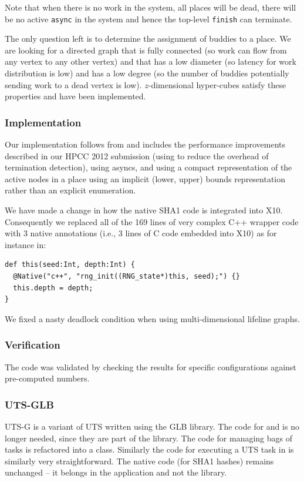Note that when there is no work in the system, all places will be dead,
there will be no active \texttt{async} in the system and hence the
top-level \texttt{finish} can terminate. 

The only question left is to determine the assignment of buddies to a
place. We are looking for a directed graph that is fully connected (so
work can flow from any vertex to any other vertex) and that has a low
diameter (so latency for work distribution is low) and has a low
degree (so the number of buddies potentially sending work to a dead
vertex is low).  $z$-dimensional hyper-cubes  satisfy these properties
and have been implemented. 

\subsubsection{Implementation}\label{sec:uts-inline}
Our implementation follows from \cite{glb} and includes the
performance improvements described in our HPCC 2012 submission
(using  to reduce the overhead of termination
detection), using  asyncs,  and using a compact
representation of the active nodes in a place using an implicit (lower,
upper) bounds representation rather than an explicit enumeration.

We have made a change in how the native SHA1 code is integrated into
X10. Consequently we replaced all of the 169 lines of very complex C++ wrapper code
with 3 native annotations (i.e., 3 lines of C code embedded into X10) as for instance in:

{\small
\begin{verbatim}
def this(seed:Int, depth:Int) {
  @Native("c++", "rng_init((RNG_state*)this, seed);") {}
  this.depth = depth;
}
\end{verbatim}
}

We fixed a nasty deadlock condition when using multi-dimensional lifeline graphs.


\subsubsection{Verification}
The code was validated by checking the results for specific
configurations against pre-computed numbers. 


\subsubsection{UTS-GLB}\label{sec:utsg}
UTS-G is a variant of UTS written using the GLB library. The code for
 and  is no longer
needed, since they are part of the library. The code for managing bags
of tasks is refactored into a  class. Similarly the
code for executing a UTS task  in
 is similarly very straightforward.  The native
code (for SHA1 hashes) remains unchanged -- it belongs in the
application and not the library.

